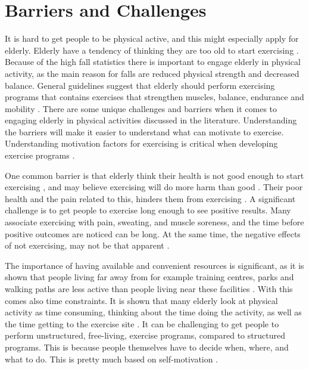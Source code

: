 \section{Barriers and Challenges}
\label{sec:barriers}
It is hard to get people to be physical active, and this might especially apply for elderly. Elderly have a tendency of thinking they are too old to start exercising \cite{schutzer}. Because of the high fall statistics there is important to engage elderly in physical activity, as the main reason for falls are reduced physical strength and decreased balance. General guidelines suggest that elderly should perform exercising programs that contains exercises that strengthen muscles, balance, endurance and mobility \cite{gruppetrening-trheim}. There are some unique challenges and barriers when it comes to engaging elderly in physical activities discussed in the literature. Understanding the barriers will make it easier to understand what can motivate to exercise. Understanding motivation factors for exercising is critical when developing exercise programs \cite{chao}.

One common barrier is that elderly think their health is not good enough to start exercising \cite{schutzer}, and may believe exercising will do more harm than good \cite{chao}. Their poor health and the pain related to this, hinders them from exercising \cite{schutzer}. A significant challenge is to get people to exercise long enough to see positive results. Many associate exercising with pain, sweating, and muscle soreness, and the time before positive outcomes are noticed can be long. At the same time, the negative effects of not exercising, may not be that apparent \cite{chao}. 

The importance of having available and convenient resources is significant, as it is shown that people living far away from for example training centres, parks and walking paths are less active than people living near these facilities \cite{schutzer}. With this comes also time constraints. It is shown that many elderly look at physical activity as time consuming, thinking about the time doing the activity, as well as the time getting to the exercise site \cite{schutzer} \cite{chao}. It can be challenging to get people to perform unstructured, free-living, exercise programs, compared to structured programs. This is because people themselves have to decide when, where, and what to do. This is pretty much based on self-motivation \cite{chao}.  

